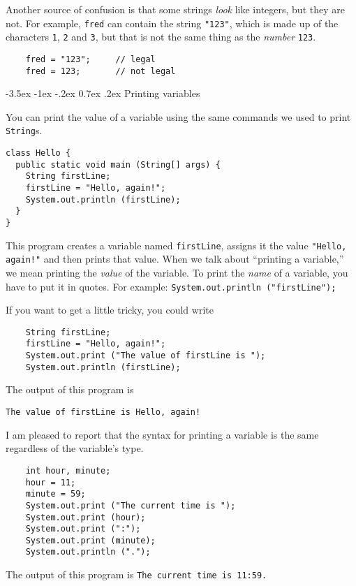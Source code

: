 \documentclass{book}
\makeatletter
\renewcommand{\section}{\@startsection 
    {section} {1} {0mm}%
    {-3.5ex \@plus -1ex \@minus -.2ex}%
    {0.7ex \@plus.2ex}%
    {\normalfont\Large\bfseries}}
\makeatother
\begin{document}
Another source of confusion is that some strings {\em look}
like integers, but they are not.  For example, {\tt fred}
can contain the string {\tt "123"}, which is made up of the
characters {\tt 1}, {\tt 2} and {\tt 3}, but that is not
the same thing as the {\em number} {\tt 123}.

\begin{verbatim}
    fred = "123";     // legal
    fred = 123;       // not legal
\end{verbatim}


\section{Printing variables}
\label{printing}

You can print the value of a variable using the same commands
we used to print {\tt String}s.

\begin{verbatim}
class Hello {
  public static void main (String[] args) {
    String firstLine;
    firstLine = "Hello, again!";
    System.out.println (firstLine);
  }
}
\end{verbatim}
%
This program creates a variable named {\tt firstLine}, assigns
it the value {\tt "Hello, again!"} and then prints that value.
When we talk about ``printing a variable,'' we mean printing
the {\em value} of the variable.  To print the {\em name} of
a variable, you have to put it in quotes.
For example: {\tt System.out.println ("firstLine");}

If you want to get a little tricky, you could write

\begin{verbatim}
    String firstLine;
    firstLine = "Hello, again!";
    System.out.print ("The value of firstLine is ");
    System.out.println (firstLine);
\end{verbatim}
%
The output of this program is

\begin{verbatim}
The value of firstLine is Hello, again!
\end{verbatim}
%
I am pleased to report that the syntax for printing a variable
is the same regardless of the variable's type.

\begin{verbatim}
    int hour, minute;
    hour = 11;
    minute = 59;
    System.out.print ("The current time is ");
    System.out.print (hour);
    System.out.print (":");
    System.out.print (minute);
    System.out.println (".");
\end{verbatim}
%
The output of this program is {\tt The current time is 11:59.}
\end{document}

